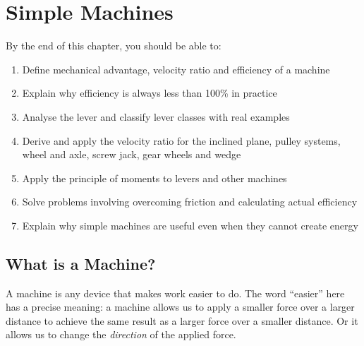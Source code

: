%

\chapter{Simple Machines}
\label{ch:simple_machines}
\minitoc
\newpage


\begin{objectivebox}
By the end of this chapter, you should be able to:
\begin{enumerate}[noitemsep]
  \item Define mechanical advantage, velocity ratio
  and efficiency of a machine
  \item Explain why efficiency is always less than
  100\% in practice
  \item Analyse the lever and classify lever classes
  with real examples
  \item Derive and apply the velocity ratio for the
  inclined plane, pulley systems, wheel and axle,
  screw jack, gear wheels and wedge
  \item Apply the principle of moments to levers and
  other machines
  \item Solve problems involving overcoming friction
  and calculating actual efficiency
  \item Explain why simple machines are useful even
  when they cannot create energy
\end{enumerate}
\end{objectivebox}

\section{What is a Machine?}

A machine is any device that makes work easier to
do. The word ``easier'' here has a precise meaning:
a machine allows us to apply a smaller force over a
larger distance to achieve the same result as a larger
force over a smaller distance. Or it allows us to
change the \textit{direction} of the applied force.

